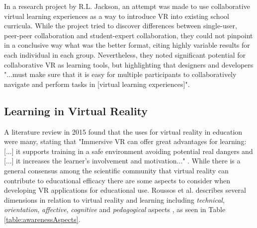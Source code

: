 In a research project by R.L. Jackson, an attempt was made to use collaborative virtual learning experiences as a way to introduce VR into existing school curricula. While the project tried to discover differences between single-user, peer-peer collaboration and student-expert collaboration, they could not pinpoint in a conclusive way what was the better format, citing highly variable results for each individual in each group. Nevertheless, they noted significant potential for collaborative VR as learning tools, but highlighting that designers and developers "...must  make  sure  that it is easy for multiple participants to collaboratively navigate and  perform  tasks  in  [virtual learning experiences]"\cite{jackson2000collaboration}. 


\subsection{Learning in Virtual Reality}
\label{learningVR}
A literature review in 2015 found that the uses for virtual reality in education were many, stating that "Immersive VR can offer great advantages for learning:  [...] it supports training in a safe environment avoiding potential real dangers and [...] it increases the learner's involvement and motivation..." \cite{freina2015literature}. While there is a general consensus among the scientific community that virtual reality can contribute to educational efficacy there are some aspects to consider when developing VR applications for educational use. Roussos et al. describes several dimensions in relation to virtual reality and learning including \textit{technical}, \textit{orientation}, \textit{affective}, \textit{cognitive} and \textit{pedagogical} aspects \cite{roussos1999learning}, as seen in Table \ref{table:awarenessAspects}.



